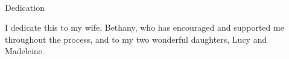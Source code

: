 

\renewcommand{\baselinestretch}{2}
\small\normalsize
\hbox{\ }

\vspace{-.65in}

\begin{center}
\large{Dedication}
\end{center}

\noindent I dedicate this to my wife, Bethany, who has encouraged and supported me throughout the process, and to my two wonderful daughters, Lucy and Madeleine.
